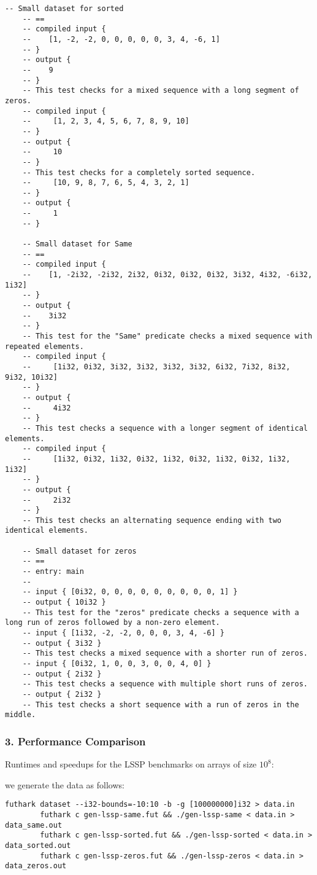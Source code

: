 \documentclass{article}
\begin{document}
    \begin{lstlisting}[language=Futhark]
    -- Small dataset for sorted
    -- ==
    -- compiled input {
    --    [1, -2, -2, 0, 0, 0, 0, 0, 3, 4, -6, 1]
    -- }  
    -- output { 
    --    9
    -- }
    -- This test checks for a mixed sequence with a long segment of zeros. 
    -- compiled input {
    --     [1, 2, 3, 4, 5, 6, 7, 8, 9, 10]
    -- }
    -- output {
    --     10
    -- }
    -- This test checks for a completely sorted sequence. 
    --     [10, 9, 8, 7, 6, 5, 4, 3, 2, 1]
    -- }
    -- output {
    --     1
    -- }

    -- Small dataset for Same
    -- ==
    -- compiled input {
    --    [1, -2i32, -2i32, 2i32, 0i32, 0i32, 0i32, 3i32, 4i32, -6i32, 1i32]
    -- }
    -- output {
    --    3i32
    -- }
    -- This test for the "Same" predicate checks a mixed sequence with repeated elements. 
    -- compiled input {
    --     [1i32, 0i32, 3i32, 3i32, 3i32, 3i32, 6i32, 7i32, 8i32, 9i32, 10i32]
    -- }
    -- output {
    --     4i32
    -- }
    -- This test checks a sequence with a longer segment of identical elements. 
    -- compiled input {
    --     [1i32, 0i32, 1i32, 0i32, 1i32, 0i32, 1i32, 0i32, 1i32, 1i32]
    -- }
    -- output {
    --     2i32
    -- }
    -- This test checks an alternating sequence ending with two identical elements. 

    -- Small dataset for zeros
    -- ==
    -- entry: main
    -- 
    -- input { [0i32, 0, 0, 0, 0, 0, 0, 0, 0, 0, 1] }
    -- output { 10i32 }
    -- This test for the "zeros" predicate checks a sequence with a long run of zeros followed by a non-zero element. 
    -- input { [1i32, -2, -2, 0, 0, 0, 3, 4, -6] }
    -- output { 3i32 }
    -- This test checks a mixed sequence with a shorter run of zeros. 
    -- input { [0i32, 1, 0, 0, 3, 0, 0, 4, 0] }
    -- output { 2i32 }
    -- This test checks a sequence with multiple short runs of zeros. 
    -- output { 2i32 }
    -- This test checks a short sequence with a run of zeros in the middle. 
    \end{lstlisting}

    \subsubsection*{3. Performance Comparison}

    Runtimes and speedups for the LSSP benchmarks on arrays of size
    $10^8$:

    we generate the data as follows:
    \begin{lstlisting}[language=Futhark, basicstyle=\footnotesize]
        futhark dataset --i32-bounds=-10:10 -b -g [100000000]i32 > data.in
        futhark c gen-lssp-same.fut && ./gen-lssp-same < data.in > data_same.out
        futhark c gen-lssp-sorted.fut && ./gen-lssp-sorted < data.in > data_sorted.out
        futhark c gen-lssp-zeros.fut && ./gen-lssp-zeros < data.in > data_zeros.out
    \end{lstlisting}
\end{document}
